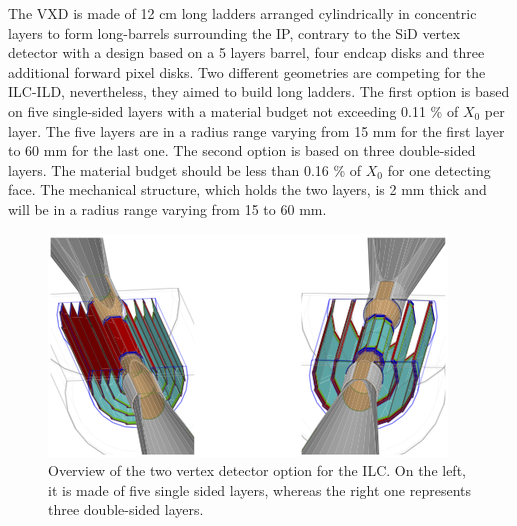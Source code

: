    The \gls{VXD} is made of 12 cm long ladders arranged cylindrically in concentric layers to form long-barrels surrounding the \gls{IP}, contrary to the \gls{SiD} vertex detector with a design based on a 5 layers barrel, four endcap disks and three additional forward pixel disks\cite{Behnke2010}.
   Two different geometries are competing for the \gls{ILC}-{ILD}, nevertheless, they aimed to build long ladders. 
   The first option is based on five single-sided layers with a material budget not exceeding 0.11 \% of $X_0$ per layer.
   The five layers are in a radius range varying from 15 mm for the first layer to 60 mm for the last one.
   The second option is based on three double-sided layers.
   The material budget should be less than 0.16 \% of $X_0$ for one detecting face.
   The mechanical structure, which holds the two layers, is 2 mm thick and will be in a radius range varying from 15 to 60 mm.

   
   
   \begin{figure}[!h]
     \centering
     \includegraphics[width = 10 cm]{Pictures/vxd/ild_VXD.png}
     \caption{Overview of the two vertex detector option for the ILC. On the left, it is made of five single sided layers, whereas the right one represents three double-sided layers.}
   \end{figure}
   
